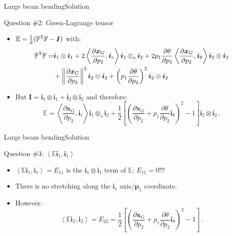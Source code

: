 \documentclass{beamer}
\newcommand{\demi}{\frac{1}{2}}
\newcommand{\itr}{{\sf T}}
\newcommand{\Id}{{\boldsymbol I}}
\newcommand{\xj}{x}
\newcommand{\xv}{{\boldsymbol\xj}}
\renewcommand{\ij}{i}
\newcommand{\pj}{p}
\newcommand{\iv}{{\boldsymbol\ij}}
\newcommand{\pv}{{\boldsymbol\pj}}
\newcommand{\Fp}{{\mathbb F}}
\newcommand{\GreenLj}{E}
\newcommand{\GreenL}{{\mathbb\GreenLj}}
\newcommand{\scal}[1]{\left\langle{#1}\right\rangle}
\newcommand{\norm}[1]{\left\|#1\right\|}
\begin{document}
\begin{frame}{Large beam bending}{Solution}
\begin{overprint}
\vskip-20pt
\begin{exampleblock}{Question \#2: Green-Lagrange tensor}
\begin{itemize}
\item $\GreenL=\demi(\Fp^\itr\Fp-\Id)$ with:
\vskip-10pt
{\scriptsize
\begin{displaymath}
\begin{split}
\Fp^\itr\Fp= &\iv_1\otimes\iv_1+2\scal{\frac{\partial\xv_G}{\partial\pj_2},\iv_r}\iv_1\otimes_s\iv_2+2\pj_1\frac{\partial\theta}{\partial\pj_2}\scal{\frac{\partial\xv_G}{\partial\pj_2},\iv_\theta}\iv_2\otimes\iv_2 \\
&+\norm{\frac{\partial\xv_G}{\partial\pj_2}}^2\iv_2\otimes\iv_2+\left(\pj_1\frac{\partial\theta}{\partial\pj_2}\right)^2\iv_2\otimes\iv_2
\end{split}
\end{displaymath}}
\item But $\Id=\iv_1\otimes\iv_1+\iv_2\otimes\iv_2$ and therefore:
\vskip-10pt
{\scriptsize
\begin{displaymath}
\boxed{\GreenL=\scal{\frac{\partial\xv_G}{\partial\pj_2},\iv_r}\iv_1\otimes_s\iv_2+\demi\left[\left(\frac{\partial\xv_G}{\partial\pj_2}+\pj_1\frac{\partial\theta}{\partial\pj_2}\iv_\theta\right)^2-1\right]\iv_2\otimes\iv_2}\,.
\end{displaymath}}
\end{itemize}
\end{exampleblock}

\end{overprint}

\end{frame}

\begin{frame}{Large beam bending}{Solution}

\begin{exampleblock}{Question \#3: $\scal{\GreenL\iv_1,\iv_1}$}
\begin{itemize}
\item $\scal{\GreenL\iv_1,\iv_1}=\GreenLj_{11}$ is the $\iv_1\otimes\iv_1$ term of $\GreenL$: $\GreenLj_{11}=0$!!!
\item There is no stretching along the $\iv_1$ axis/$\pv_1$ coordinate.
\item However:
\begin{displaymath}
\scal{\GreenL\iv_2,\iv_2}=\GreenLj_{22}=\demi\left[\left(\frac{\partial\xv_G}{\partial\pj_2}+\pj_1\frac{\partial\theta}{\partial\pj_2}\iv_\theta\right)^2-1\right]\,.
\end{displaymath}
\end{itemize}
\end{exampleblock}

\end{frame}
\end{document}
